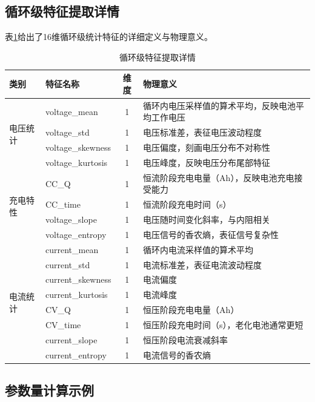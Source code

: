 \documentclass[10pt,a4paper]{ctexart}
\begin{document}
\subsection{循环级特征提取详情}

表\ref{tab:features}给出了16维循环级统计特征的详细定义与物理意义。

\begin{table}[H]
\centering
\caption{循环级特征提取详情}
\label{tab:features}
\begin{tabular}{@{}llcp{6cm}@{}}
\toprule
\textbf{类别} & \textbf{特征名称} & \textbf{维度} & \textbf{物理意义} \\
\midrule
\multirow{4}{*}{电压统计} 
& voltage\_mean & 1 & 循环内电压采样值的算术平均，反映电池平均工作电压 \\
& voltage\_std & 1 & 电压标准差，表征电压波动程度 \\
& voltage\_skewness & 1 & 电压偏度，刻画电压分布不对称性 \\
& voltage\_kurtosis & 1 & 电压峰度，反映电压分布尾部特征 \\
\midrule
\multirow{4}{*}{充电特性} 
& CC\_Q & 1 & 恒流阶段充电电量（Ah），反映电池充电接受能力 \\
& CC\_time & 1 & 恒流阶段充电时间（s） \\
& voltage\_slope & 1 & 电压随时间变化斜率，与内阻相关 \\
& voltage\_entropy & 1 & 电压信号的香农熵，表征信号复杂性 \\
\midrule
\multirow{8}{*}{电流统计} 
& current\_mean & 1 & 循环内电流采样值的算术平均 \\
& current\_std & 1 & 电流标准差，表征电流波动程度 \\
& current\_skewness & 1 & 电流偏度 \\
& current\_kurtosis & 1 & 电流峰度 \\
& CV\_Q & 1 & 恒压阶段充电电量（Ah） \\
& CV\_time & 1 & 恒压阶段充电时间（s），老化电池通常更短 \\
& current\_slope & 1 & 恒压阶段电流衰减斜率 \\
& current\_entropy & 1 & 电流信号的香农熵 \\
\bottomrule
\end{tabular}
\end{table}

\subsection{参数量计算示例}
\end{document}
